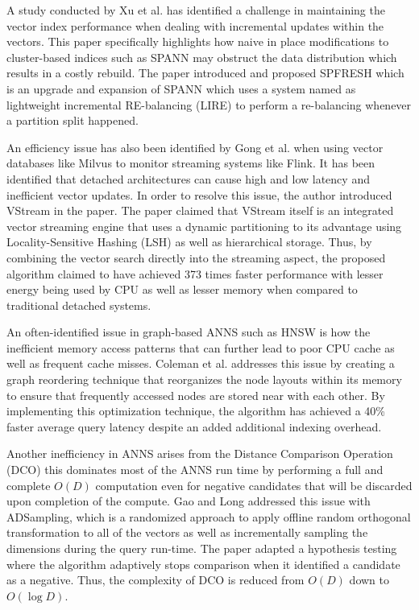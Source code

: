 \documentclass[conference]{IEEEtran}
\begin{document}
A study conducted by Xu et al. \cite{xu2023} has identified a challenge in maintaining the vector index performance when dealing with incremental updates within the vectors. This paper specifically highlights how naive in place modifications to cluster-based indices such as SPANN may obstruct the data distribution which results in a costly rebuild. The paper introduced and proposed SPFRESH which is an upgrade and expansion of SPANN which uses a system named as lightweight incremental RE-balancing (LIRE) to perform a re-balancing whenever a partition split happened.

An efficiency issue has also been identified by Gong et al. \cite{gong2025} when using vector databases like Milvus to monitor streaming systems like Flink. It has been identified that detached architectures can cause high and low latency and inefficient vector updates. In order to resolve this issue, the author introduced VStream in the paper. The paper claimed that VStream itself is an integrated vector streaming engine that uses a dynamic partitioning to its advantage using Locality-Sensitive Hashing (LSH) as well as hierarchical storage. Thus, by combining the vector search directly into the streaming aspect, the proposed algorithm claimed to have achieved 373 times faster performance with lesser energy being used by CPU as well as lesser memory when compared to traditional detached systems.

An often-identified issue in graph-based ANNS such as HNSW is how the inefficient memory access patterns that can further lead to poor CPU cache as well as frequent cache misses. Coleman et al. \cite{coleman2022} addresses this issue by creating a graph reordering technique that reorganizes the node layouts within its memory to ensure that frequently accessed nodes are stored near with each other. By implementing this optimization technique, the algorithm has achieved a 40\% faster average query latency despite an added additional indexing overhead.

Another inefficiency in ANNS arises from the Distance Comparison Operation (DCO) this dominates most of the ANNS run time by performing a full and complete $O(D)$ computation even for negative candidates that will be discarded upon completion of the compute. Gao and Long \cite{gao2023} addressed this issue with ADSampling, which is a randomized approach to apply offline random orthogonal transformation to all of the vectors as well as incrementally sampling the dimensions during the query run-time. The paper adapted a hypothesis testing where the algorithm adaptively stops comparison when it identified a candidate as a negative. Thus, the complexity of DCO is reduced from $O(D)$ down to $O(\log D)$.
\end{document}
